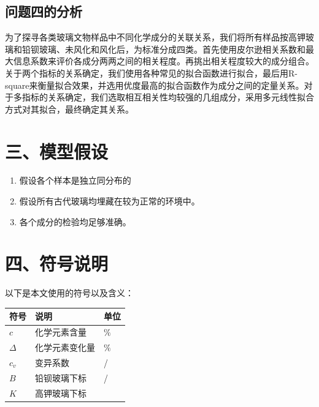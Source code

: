 \documentclass{my_paper}
\begin{document}
\subsection{问题四的分析}
为了探寻各类玻璃文物样品中不同化学成分的关联关系，我们将所有样品按高钾玻璃和铅钡玻璃、未风化和风化后，为标准分成四类。首先使用皮尔逊相关系数和最大信息系数来评价各成分两两之间的相关程度。再挑出相关程度较大的成分组合。关于两个指标的关系确定，我们使用各种常见的拟合函数进行拟合，最后用R-square来衡量拟合效果，并选用优度最高的拟合函数作为成分之间的定量关系。对于多指标的关系确定，我们选取相互相关性均较强的几组成分，采用多元线性拟合方式对其拟合，最终确定其关系。
\section{三、模型假设}
\begin{enumerate}
    \item 假设各个样本是独立同分布的
    \item 假设所有古代玻璃均埋藏在较为正常的环境中。
\item  各个成分的检验均足够准确。
 


\end{enumerate}

\section{四、符号说明}


以下是本文使用的符号以及含义：
\begin{table}[h]%
    \centering
    \begin{tabular}{p{2.0cm}<{\centering}p{9.0cm}<{\centering}p{2.0cm}<{\centering}}
    \hline
    符号 & 说明 & 单位 \\ %
    \hline
    $c$ & 化学元素含量 &  $\%$\\
    $\Delta$ & 化学元素变化量 &  $\%$\\
    $c_v$ & 变异系数 &  /\\
    $B$ & 铅钡玻璃下标 & / \\
    $K$ & 高钾玻璃下标 &  \\
    \hline
    \end{tabular}
\end{table}
\end{document}

